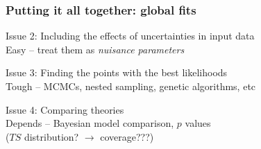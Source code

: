 \documentclass[xcolor=dvipsnames]{beamer}
\newcommand{\cbluewhen}[2]{{\color#2[rgb]{0.1, 0.0, 0.6} #1}}
\begin{document}
\begin{frame}
\frametitle{Putting it all together: global fits}  

  \alert{Issue 2:} Including the effects of uncertainties in input data\\
  Easy -- treat them as \emph{nuisance parameters}\vspace{4mm}

  \alert{Issue 3:} Finding the points with the best likelihoods\\
  \cbluewhen{Tough -- MCMCs, nested sampling, genetic algorithms, etc}{<2>}\vspace{4mm}

  \alert{Issue 4:} Comparing theories\\
  \cbluewhen{Depends -- Bayesian model comparison, $p$ values\\
  \hspace{40mm}($TS$ distribution? $\longrightarrow$ coverage???)}{<2>} 

\end{frame}
\end{document}
